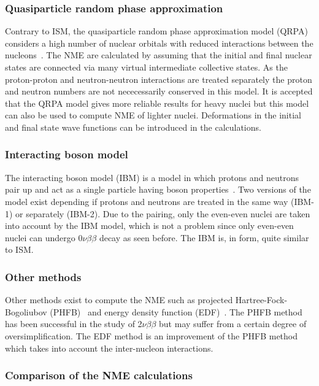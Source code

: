 \documentclass[main.tex]{subfiles}
\begin{document}
\subsubsection{Quasiparticle random phase approximation}


\NI Contrary to ISM, the quasiparticle random phase approximation model (QRPA) considers a high number of nuclear orbitals with reduced interactions between the nucleons~\cite{QRPA_1,QRPA_2,QRPA_3}. The NME are calculated by assuming that the initial and final nuclear states are connected via many virtual intermediate collective states. As the proton-proton and neutron-neutron interactions are treated separately the proton and neutron numbers are not nececessarily conserved in this model. It is accepted that the QRPA model gives more reliable results for heavy nuclei but this model can also be used to compute NME of lighter nuclei. Deformations in the initial and final state wave functions can be introduced in the calculations. 


\subsubsection{Interacting boson model}


\NI The interacting boson model (IBM) is a model in which protons and neutrons pair up and act as a single particle having boson properties~\cite{IBM}. Two versions of the model exist depending if protons and neutrons are treated in the same way (IBM-1) or separately (IBM-2). Due to the pairing, only the even-even nuclei are taken into account by the IBM model, which is not a problem since only even-even nuclei can undergo 0$\nu\beta\beta$ decay as seen before. The IBM is, in form, quite similar to ISM.


\subsubsection{Other methods}


\NI Other methods exist to compute the NME such as projected Hartree-Fock-Bogoliubov (PHFB)~\cite{PHFB_1,PHFB_2} and energy density function (EDF)~\cite{EDF_1,EDF_2,EDF_3}. The PHFB method has been successful in the study of 2$\nu\beta\beta$ but may suffer from a certain degree of oversimplification. The EDF method is an improvement of the PHFB method which takes into account the inter-nucleon interactions.


\subsubsection{Comparison of the NME calculations}
\end{document}

